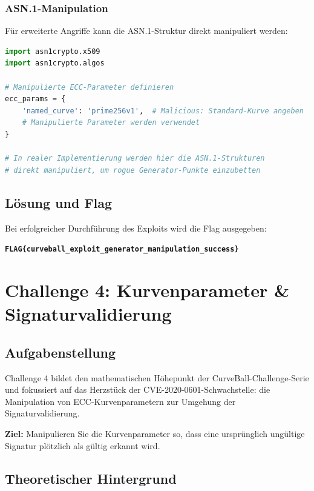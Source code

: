 \documentclass{article}
\begin{document}
\subsubsection{ASN.1-Manipulation}

Für erweiterte Angriffe kann die ASN.1-Struktur direkt manipuliert werden:

\begin{lstlisting}[language=python, caption=ASN.1 ECC Parameter Manipulation]
import asn1crypto.x509
import asn1crypto.algos

# Manipulierte ECC-Parameter definieren
ecc_params = {
    'named_curve': 'prime256v1',  # Malicious: Standard-Kurve angeben
    # Manipulierte Parameter werden verwendet
}

# In realer Implementierung werden hier die ASN.1-Strukturen
# direkt manipuliert, um rogue Generator-Punkte einzubetten
\end{lstlisting}

\subsection{Lösung und Flag}

Bei erfolgreicher Durchführung des Exploits wird die Flag ausgegeben:

\begin{center}
\textbf{\texttt{FLAG\{curveball\_exploit\_generator\_manipulation\_success\}}}
\end{center}

\newpage

\section{Challenge 4: Kurvenparameter \& Signaturvalidierung}

\subsection{Aufgabenstellung}

Challenge 4 bildet den mathematischen Höhepunkt der CurveBall-Challenge-Serie und fokussiert auf das Herzstück der CVE-2020-0601-Schwachstelle: die Manipulation von ECC-Kurvenparametern zur Umgehung der Signaturvalidierung.

\textbf{Ziel:} Manipulieren Sie die Kurvenparameter so, dass eine ursprünglich ungültige Signatur plötzlich als gültig erkannt wird.

\subsection{Theoretischer Hintergrund}
\end{document}
